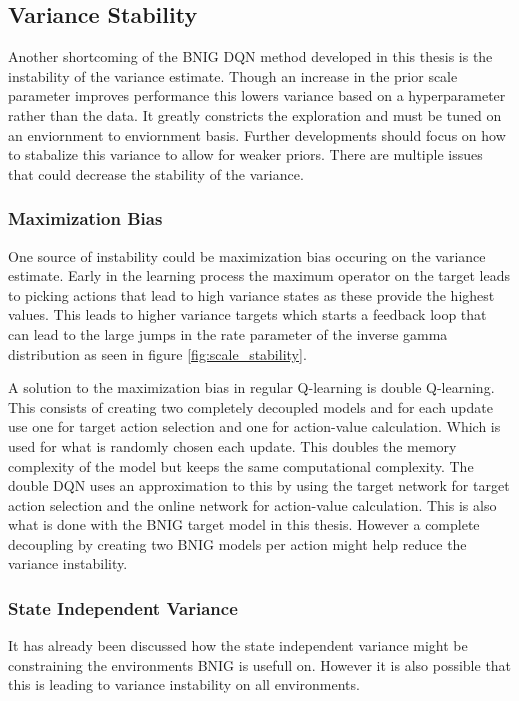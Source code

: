 \subsection{Variance Stability}

Another shortcoming of the BNIG DQN method developed in this thesis is the instability of the variance estimate. Though an increase in the prior scale parameter improves performance this lowers variance based on a hyperparameter rather than the data. It greatly constricts the exploration and must be tuned on an enviornment to enviornment basis. Further developments should focus on how to stabalize this variance to allow for weaker priors. There are multiple issues that could decrease the stability of the variance.


\subsubsection{Maximization Bias}

One source of instability could be maximization bias\citep[p.~134]{sutton_barto_2018} occuring on the variance estimate. Early in the learning process the maximum operator on the target leads to picking actions that lead to high variance states as these provide the highest values. This leads to higher variance targets which starts a feedback loop that can lead to the large jumps in the rate parameter of the inverse gamma distribution as seen in figure \ref{fig:scale_stability}.

A solution to the maximization bias in regular Q-learning is double Q-learning\citep[p.~134]{sutton_barto_2018}. This consists of creating two completely decoupled models and for each update use one for target action selection and one for action-value calculation. Which is used for what is randomly chosen each update. This doubles the memory complexity of the model but keeps the same computational complexity. The double DQN uses an approximation to this by using the target network for target action selection and the online network for action-value calculation. This is also what is done with the BNIG target model in this thesis. However a complete decoupling by creating two BNIG models per action might help reduce the variance instability.

\subsubsection{State Independent Variance}

It has already been discussed how the state independent variance might be constraining the environments BNIG is usefull on. However it is also possible that this is leading to variance instability on all environments. 

